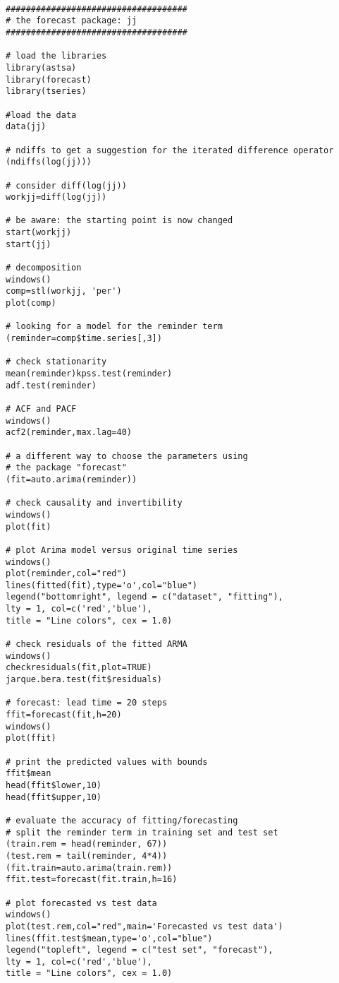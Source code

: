 \begin{example}
    \begin{verbatim}

####################################
# the forecast package: jj
####################################

# load the libraries
library(astsa)
library(forecast)
library(tseries)

#load the data
data(jj)

# ndiffs to get a suggestion for the iterated difference operator
(ndiffs(log(jj)))

# consider diff(log(jj))
workjj=diff(log(jj))

# be aware: the starting point is now changed
start(workjj)
start(jj)

# decomposition
windows()
comp=stl(workjj, 'per')
plot(comp)

# looking for a model for the reminder term
(reminder=comp$time.series[,3])

# check stationarity
mean(reminder)kpss.test(reminder)
adf.test(reminder)

# ACF and PACF
windows()
acf2(reminder,max.lag=40)

# a different way to choose the parameters using
# the package "forecast"
(fit=auto.arima(reminder))

# check causality and invertibility
windows()
plot(fit)

# plot Arima model versus original time series
windows()
plot(reminder,col="red")
lines(fitted(fit),type='o',col="blue")
legend("bottomright", legend = c("dataset", "fitting"),
lty = 1, col=c('red','blue'),
title = "Line colors", cex = 1.0)

# check residuals of the fitted ARMA
windows()
checkresiduals(fit,plot=TRUE)
jarque.bera.test(fit$residuals)

# forecast: lead time = 20 steps
ffit=forecast(fit,h=20)
windows()
plot(ffit)

# print the predicted values with bounds
ffit$mean
head(ffit$lower,10)
head(ffit$upper,10)

# evaluate the accuracy of fitting/forecasting
# split the reminder term in training set and test set
(train.rem = head(reminder, 67))
(test.rem = tail(reminder, 4*4))
(fit.train=auto.arima(train.rem))
ffit.test=forecast(fit.train,h=16)

# plot forecasted vs test data
windows()
plot(test.rem,col="red",main='Forecasted vs test data')
lines(ffit.test$mean,type='o',col="blue")
legend("topleft", legend = c("test set", "forecast"),
lty = 1, col=c('red','blue'),
title = "Line colors", cex = 1.0)


\end{verbatim}
\end{example}
